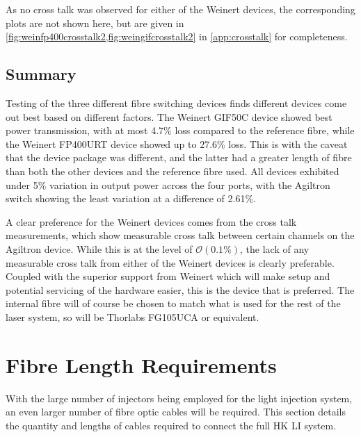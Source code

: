 \documentclass[a4paper,11pt]{article}
\begin{document}
As no cross talk was observed for either of the Weinert devices, the corresponding plots are not shown here, but are given in \cref{fig:weinfp400crosstalk2,fig:weingifcrosstalk2} in \cref{app:crosstalk} for completeness.

\subsection{Summary}
Testing of the three different fibre switching devices finds different devices come out best based on different factors. The Weinert GIF50C device showed best power transmission, with at most 4.7\% loss compared to the reference fibre, while the Weinert FP400URT device showed up to 27.6\% loss. This is with the caveat that the device package was different, and the latter had a greater length of fibre than both the other devices and the reference fibre used. All devices exhibited under 5\% variation in output power across the four ports, with the Agiltron switch showing the least variation at a difference of 2.61\%.

A clear preference for the Weinert devices comes from the cross talk measurements, which show measurable cross talk between certain channels on the Agiltron device. While this is at the level of $\mathcal{O}(0.1\%)$, the lack of any measurable cross talk from either of the Weinert devices is clearly preferable. Coupled with the superior support from Weinert which will make setup and potential servicing of the hardware easier, this is the device that is preferred. The internal fibre will of course be chosen to match what is used for the rest of the laser system, so will be Thorlabs FG105UCA or equivalent.


\section{Fibre Length Requirements}\label{sec:lengths}

With the large number of injectors being employed for the light injection system, an even larger number of fibre optic cables will be required. This section details the quantity and lengths of cables required to connect the full HK LI system.
\end{document}
